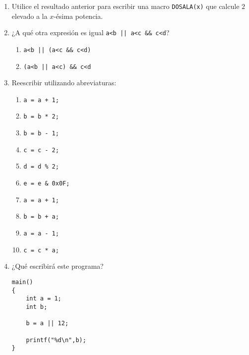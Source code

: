 \begin{enumerate}
\item Utilice el resultado anterior para escribir una macro \lstinline{DOSALA(x)} que calcule $2$ elevado a la $x$-ésima potencia.

\item ¿A qué otra expresión es igual \lstinline{a<b || a<c && c<d}?

\begin{enumerate}[label=\alph*.]
	\item \lstinline{a<b || (a<c && c<d)}
	\item \lstinline{(a<b || a<c) && c<d}
\end{enumerate}

\item Reescribir utilizando abreviaturas:
\begin{enumerate}[label=\alph*.]
	\item \lstinline{a = a + 1;}
	\item \lstinline{b = b * 2;}
	\item \lstinline{b = b - 1;}
	\item \lstinline{c = c - 2;}
	\item \lstinline{d = d % 2;}
	\item \lstinline{e = e & 0x0F;}
	\item \lstinline{a = a + 1;}
	\item \lstinline{b = b + a;}
	\item \lstinline{a = a - 1;}
	\item \lstinline{c = c * a;}
\end{enumerate}

\item ¿Qué escribirá este programa?
\begin{lstlisting}
main()
{
	int a = 1;
	int b;

	b = a || 12;

	printf("%d\n",b);
}

\end{lstlisting}
\end{enumerate}



